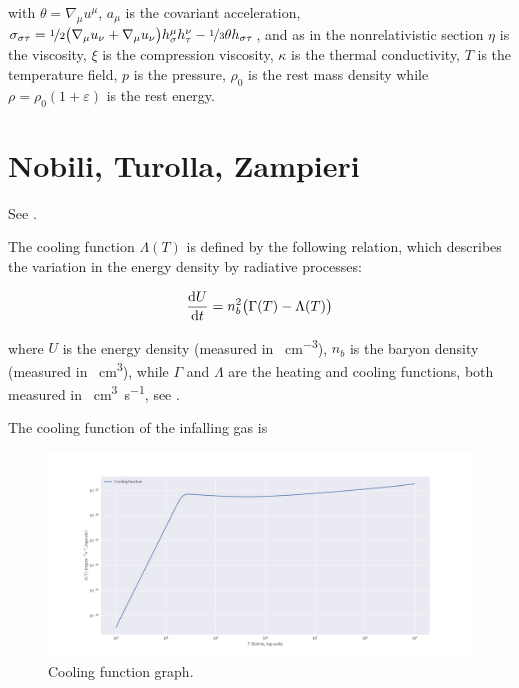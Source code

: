 \documentclass[main.tex]{subfiles}
\begin{document}
with \(\theta = \nabla_\mu u^\mu\), \(a_\mu\) is the covariant acceleration, \(\sigma_{\sigma \tau} = \frac[i]{1}{2} \qty(\nabla_\mu u_\nu + \nabla_\mu u_\nu) h^\mu_\sigma h^\nu _\tau - \frac[i]{1}{3} \theta h_{\sigma \tau}\),
and as in the nonrelativistic section \(\eta\) is the viscosity, \(\xi\) is the compression viscosity,  \(\kappa\) is the thermal conductivity, \(T\) is the temperature field, \(p\) is the pressure, \(\rho_0\) is the rest mass density while \(\rho = \rho_0 (1 + \varepsilon)\) is the rest energy.

\section{Nobili, Turolla, Zampieri}

See \cite{NTZ91}.

The cooling function \(\Lambda (T)\) is defined by the following relation, which describes the variation in the energy density by radiative processes:

\begin{equation}
    \dv{U}{t} = n^2_b \qty(\Gamma(T) - \Lambda (T))
\end{equation}

where \(U\) is the energy density (measured in \si{\erg\per\cubic\centi\metre}), \(n_b\) is the baryon density (measured in \si{\per\cubic\centi\metre}), while \(\Gamma\) and \(\Lambda\) are the heating and cooling functions, both measured in \si{\erg\cubic\centi\metre\per\second}, see \cite[equation 1]{Gnedin_2012}.

The cooling function of the infalling gas is

\begin{figure}
    \centering
    \includegraphics[width=\textwidth]{figures/cooling_function.png}
    \caption{Cooling function graph.}
    \label{fig:cooling-function}
\end{figure}
\end{document}
